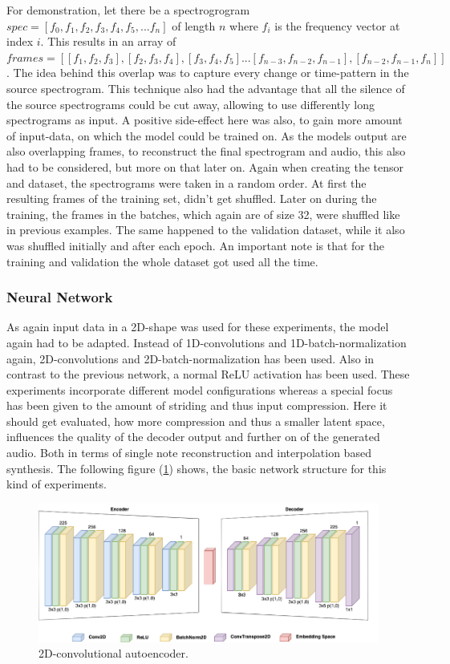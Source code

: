 For demonstration, let there be a spectrogrogram $spec=[f_0, f_1, f_2, f_3, f_4, f_5, ... f_n]$ of length $n$ where $f_i$ is the frequency vector at index $i$. This results in an array of $frames=[[f_1, f_2, f_3], [f_2, f_3, f_4], [f_3, f_4, f_5] ... [f_{n-3}, f_{n-2}, f_{n-1}], [f_{n-2}, f_{n-1}, f_n]]$. The idea behind this overlap was to capture every change or time-pattern in the source spectrogram. This technique also had the advantage that all the silence of the source spectrograms could be cut away, allowing to use differently long spectrograms as input. A positive side-effect here was also, to gain more amount of input-data, on which the model could be trained on. As the models output are also overlapping frames, to reconstruct the final spectrogram and audio, this also had to be considered, but more on that later on. Again when creating the tensor and dataset, the spectrograms were taken in a random order. At first the resulting frames of the training set, didn't get shuffled. Later on during the training, the frames in the batches, which again are of size 32, were shuffled like in previous examples. The same happened to the validation dataset, while it also was shuffled initially and after each epoch. An important note is that for the training and validation the whole dataset got used all the time. 

\subsubsection{Neural Network}
As again input data in a 2D-shape was used for these experiments, the model again had to be adapted. Instead of 1D-convolutions and 1D-batch-normalization again, 2D-convolutions and 2D-batch-normalization has been used. Also in contrast to the previous network, a normal ReLU activation has been used. These experiments incorporate different model configurations whereas a special focus has been given to the amount of striding and thus input compression. Here it should get evaluated, how more compression and thus a smaller latent space, influences the quality of the decoder output and further on of the generated audio. Both in terms of single note reconstruction and interpolation based synthesis. The following figure (\ref{fig:exp_2D_cae}) shows, the basic network structure for this kind of experiments.

 \begin{figure}[htb!]
	\caption{2D-convolutional autoencoder.}
	\label{fig:exp_2D_cae}
	\centering
	\includegraphics[width=\textwidth]{images/experiments/autoencoder_2D.png}
\end{figure}

